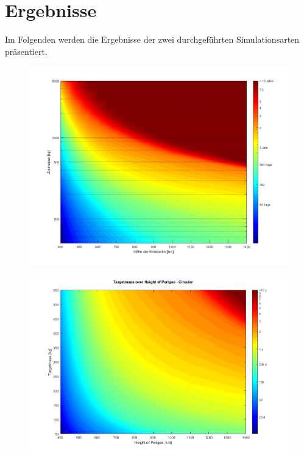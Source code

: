\section{Ergebnisse}
Im Folgenden werden die Ergebnisse der zwei durchgeführten Simulationsarten präsentiert.
\begin{figure}[h]
\centering
\includegraphics[width=1.00\textwidth]{./graphics/GMAT/GMAT_Mass_over_Height.png}
\label{fig:Mass_over_Height}
\end{figure}



\begin{figure}[h!]
	\centering
		\includegraphics[width=1.00\textwidth]{./graphics/GMAT/GMAT_Mass_over_Height_550.png}
	\label{fig:GMAT_Mass_over_Height_550}
\end{figure}

